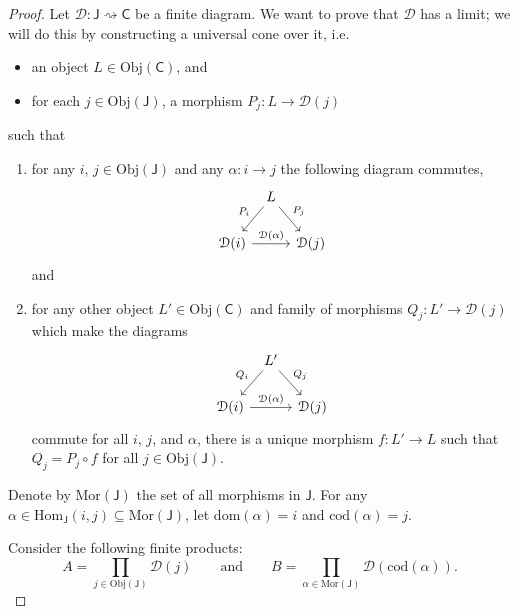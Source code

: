 \documentclass[a4paper,10pt]{scrreprt}
\newcommand{\Obj}{\mathrm{Obj}}
\newcommand{\Hom}{\mathrm{Hom}}
\newcommand{\Mor}{\mathrm{Mor}}
\newcommand{\dom}{\mathrm{dom}}
\newcommand{\cod}{\mathrm{cod}}
\theoremstyle{definition}
\theoremstyle{plain}
\theoremstyle{remark}
\begin{document}
\begin{proof}
  Let $\mathcal{D}\colon \mathsf{J} \rightsquigarrow \mathsf{C}$ be a finite diagram. We want to prove that $\mathcal{D}$ has a limit; we will do this by constructing a universal cone over it, i.e.
  \begin{itemize}
    \item an object $L \in \Obj(\mathsf{C})$, and
    \item for each $j \in \Obj(\mathsf{J})$, a morphism $P_{j}\colon L \to \mathcal{D}(j)$ 
  \end{itemize}
  such that
  \begin{enumerate}
    \item for any $i$, $j \in \Obj(\mathsf{J})$ and any $\alpha\colon i \to j$ the following diagram commutes,
      \begin{equation*}
        \begin{tikzcd}[column sep=tiny]
          & L
          \arrow[dl, swap, "P_{i}"]
          \arrow[dr, "P_{j}"]
          \\
          \mathcal{D}(i)
          \arrow[rr, "\mathcal{D}(\alpha)"]
          & & \mathcal{D}(j)
        \end{tikzcd}
      \end{equation*}
      and
    \item for any other object $L' \in \Obj(\mathsf{C})$ and family of morphisms $Q_{j}\colon L' \to \mathcal{D}(j)$ which make the diagrams
      \begin{equation*}
        \begin{tikzcd}[column sep=tiny]
          & L'
          \arrow[dl, swap, "Q_{i}"]
          \arrow[dr, "Q_{j}"]
          \\
          \mathcal{D}(i)
          \arrow[rr, "\mathcal{D}(\alpha)"]
          & & \mathcal{D}(j)
        \end{tikzcd}
      \end{equation*}
      commute for all $i$, $j$, and $\alpha$, there is a unique morphism $f\colon L' \to L$ such that $Q_{j} = P_{j} \circ f$ for all $j \in \Obj(\mathsf{J})$.
  \end{enumerate}

  Denote by $\Mor(\mathsf{J})$ the set of all morphisms in $\mathsf{J}$. For any $\alpha \in \Hom_{\mathsf{J}}(i, j) \subseteq \Mor(\mathsf{J})$, let $\dom(\alpha) = i$ and $\cod(\alpha) = j$.

  Consider the following finite products:
  \begin{equation*}
    A = \prod_{j \in \Obj(\mathsf{J})} \mathcal{D}(j)\qquad\text{and}\qquad B = \prod_{\alpha \in \Mor(\mathsf{J})} \mathcal{D}(\cod(\alpha)).
  \end{equation*}


\end{proof}
\end{document}
